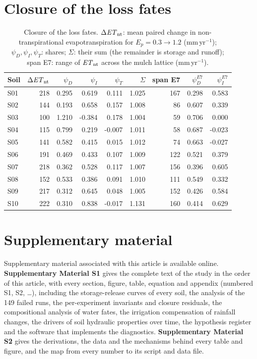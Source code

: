 \documentclass[review,12pt,authoryear]{elsarticle}
\begin{document}
\section{Closure of the loss fates}
\begin{table}[!htbp]\centering\small
\caption{Closure of the loss fates. $\Delta\mathit{ET}_{\mathrm{nt}}$: mean paired change in non-transpirational evapotranspiration for $E_p=0.3\to1.2$ (mm\,yr$^{-1}$); $\psi_D,\psi_I,\psi_T$: shares; $\Sigma$: their sum (the remainder is storage and runoff); span E7: range of $\mathit{ET}_{\mathrm{nt}}$ across the mulch lattice (mm\,yr$^{-1}$).}
\label{tab:closure}
\begin{tabular}{lrrrrrrrr}
\toprule
Soil & $\Delta\mathit{ET}_{\mathrm{nt}}$ & $\psi_D$ & $\psi_I$ & $\psi_T$ & $\Sigma$ & span E7 & $\psi_D^{E7}$ & $\psi_I^{E7}$\\\midrule
S01 & 218 & 0.295 & 0.619 & 0.111 & 1.025 & 167 & 0.298 & 0.583\\
S02 & 144 & 0.193 & 0.658 & 0.157 & 1.008 & 86 & 0.607 & 0.339\\
S03 & 100 & 1.210 & -0.384 & 0.178 & 1.004 & 59 & 0.706 & 0.000\\
S04 & 115 & 0.799 & 0.219 & -0.007 & 1.011 & 58 & 0.687 & -0.023\\
S05 & 141 & 0.582 & 0.415 & 0.015 & 1.012 & 74 & 0.663 & -0.027\\
S06 & 191 & 0.469 & 0.433 & 0.107 & 1.009 & 122 & 0.521 & 0.379\\
S07 & 218 & 0.362 & 0.528 & 0.117 & 1.007 & 156 & 0.396 & 0.605\\
S08 & 152 & 0.533 & 0.386 & 0.091 & 1.010 & 111 & 0.549 & 0.332\\
S09 & 217 & 0.312 & 0.645 & 0.048 & 1.005 & 152 & 0.426 & 0.584\\
S10 & 222 & 0.310 & 0.838 & -0.017 & 1.131 & 160 & 0.414 & 0.629\\
\bottomrule
\end{tabular}
\end{table}

\section*{Supplementary material}
Supplementary material associated with this article is available online. \textbf{Supplementary Material S1} gives the complete text of the study in the order of this article, with every section, figure, table, equation and appendix (numbered S1, S2, \ldots), including the storage-release curves of every soil, the analysis of the 149 failed runs, the per-experiment invariants and closure residuals, the compositional analysis of water fates, the irrigation compensation of rainfall changes, the drivers of soil hydraulic properties over time, the hypothesis register and the software that implements the diagnostics. \textbf{Supplementary Material S2} gives the derivations, the data and the mechanisms behind every table and figure, and the map from every number to its script and data file.



\end{document}
